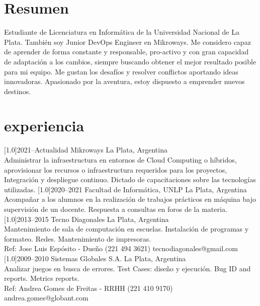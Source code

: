 \documentclass[espanol]{cv-style}     %
\begin{document}
\section{Resumen}
  \vspace{-0.3cm}
Estudiante de Licenciatura en Informática de la Universidad Nacional de La Plata.
También soy Junior DevOps Engineer en Mikroways.
Me considero capaz de aprender de forma constante y responsable, pro-activo y con gran capacidad de adaptación a los cambios, siempre buscando obtener el mejor resultado posible para mi equipo.
Me gustan los desafíos y resolver conflictos aportando ideas innovadoras.
Apasionado por la aventura, estoy dispuesto a emprender nuevos destinos.
\vspace{-0.2cm}
\section{experiencia}
  \vspace{-0.3cm}
\begin{entrylist}
\entry
  {\scalebox{.8}[1.0]{2021--Actualidad}}
  {Mikroways}
  {La Plata, Argentina}
  {\\
   Administrar la infraestructura en entornos de Cloud Computing o híbridos, aprovisionar los recursos o infraestructura requeridos para los proyectos, Integración y despliegue continuo. Dictado de capacitaciones sobre las tecnologías utilizadas.}
\entry
  {\scalebox{.8}[1.0]{2020--2021}}
  {Facultad de Informática, UNLP}
  {La Plata, Argentina}
  {\\
   Acompañar a los alumnos en la realización de trabajos prácticos en máquina
bajo supervisión de un docente. Respuesta a consultas en foros de la materia.}
\entry
  {\scalebox{.8}[1.0]{2013--2015}}
  {Tecno Diagonales}
  {La Plata, Argentina}
  {\\
  Mantenimiento de sala de computación en escuelas. Instalación de programas y formateo. Redes. Mantenimiento de impresoras.\\
  \small{Ref: Jose Luis Espósito - Dueño (221 494 3621) tecnodiagonales@gmail.com}}
\entry
  {\scalebox{.8}[1.0]{2009--2010}}
  {Sistemas Globales S.A.}
  {La Plata, Argentina}
  {\\
  Analizar juegos en busca de errores. Test Cases: diseño y ejecución. Bug ID and reports. Metrics reports.\\
  \small{Ref: Andrea Gomes de Freitas - RRHH (221 410 9170) andrea.gomes@globant.com}}
\end{entrylist}
\vspace{-0.4cm}
\end{document}

